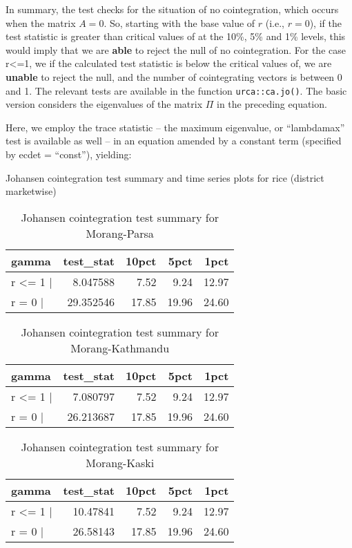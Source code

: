 \documentclass[
  12pt,
]{article}
\begin{document}
In summary, the test checks for the situation of no cointegration, which occurs when the matrix \(A=0\). So, starting with the base value of \(r\) (i.e., \(r=0\)), if the test statistic is greater than critical values of at the 10\%, 5\% and 1\% levels, this would imply that we are \textbf{able} to reject the null of no cointegration. For the case r\textless{}=1, we if the calculated test statistic is below the critical values of, we are \textbf{unable} to reject the null, and the number of cointegrating vectors is between 0 and 1. The relevant tests are available in the function \texttt{urca::ca.jo()}. The basic version considers the eigenvalues of the matrix \(\Pi\) in the preceding equation.

Here, we employ the trace statistic -- the maximum eigenvalue, or ``lambdamax'' test is available as well -- in an equation amended by a constant term (specified by ecdet = ``const''), yielding:

Johansen cointegration test summary and time series plots for rice (district marketwise)

\begin{longtable}[t]{lrrrr}
\caption{\label{tab:rice-cajo-test}Johansen cointegration test summary for Morang-Parsa}\\
\toprule
gamma & test\_stat & 10pct & 5pct & 1pct\\
\midrule
r <= 1 | & 8.047588 & 7.52 & 9.24 & 12.97\\
r = 0  | & 29.352546 & 17.85 & 19.96 & 24.60\\
\bottomrule
\end{longtable}

\begin{longtable}[t]{lrrrr}
\caption{\label{tab:rice-cajo-test}Johansen cointegration test summary for Morang-Kathmandu}\\
\toprule
gamma & test\_stat & 10pct & 5pct & 1pct\\
\midrule
r <= 1 | & 7.080797 & 7.52 & 9.24 & 12.97\\
r = 0  | & 26.213687 & 17.85 & 19.96 & 24.60\\
\bottomrule
\end{longtable}

\begin{longtable}[t]{lrrrr}
\caption{\label{tab:rice-cajo-test}Johansen cointegration test summary for Morang-Kaski}\\
\toprule
gamma & test\_stat & 10pct & 5pct & 1pct\\
\midrule
r <= 1 | & 10.47841 & 7.52 & 9.24 & 12.97\\
r = 0  | & 26.58143 & 17.85 & 19.96 & 24.60\\
\bottomrule
\end{longtable}
\end{document}
